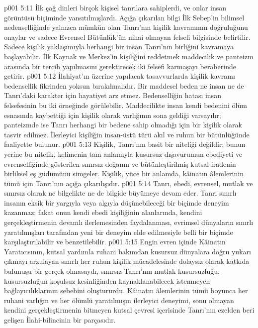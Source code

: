 \vs p001 5:11 İlk çağ dinleri birçok kişisel tanrılara sahiplerdi, ve onlar insan görüntüsü biçiminde yansıtılmışlardı. Açığa çıkarılan bilgi İlk Sebep’in bilimsel nedenselliğinde yalnızca mümkün olan Tanrı’nın kişilik kavramının doğruluğunu onaylar ve sadece Evrensel Bütünlük’ün nihai olmayan felsefi bilgisinde belirtilir. Sadece kişilik yaklaşımıyla herhangi bir insan Tanrı’nın birliğini kavramaya başlayabilir. İlk Kaynak ve Merkez’in kişiliğini reddetmek maddecilik ve panteizm arasında bir tercih yapılmasını gerektirecek iki felsefi karmaşayı beraberinde getirir.
\vs p001 5:12 İlahiyat’ın üzerine yapılacak tasavvurlarda kişilik kavramı bedensellik fikrinden yoksun bırakılmalıdır. Bir maddesel beden ne insan ne de Tanrı’daki karakter için hayatiyet arz etmez. Bedenselliğin hatası insan felsefesinin bu iki örneğinde görülebilir. Maddecilikte insan kendi bedenini ölüm esnasında kaybettiği için kişilik olarak varlığının sona geldiği varsayılır; panteizmde ise Tanrı herhangi bir bedene sahip olmadığı için bir kişilik olarak tasvir edilmez. İlerleyici kişiliğin insan\hyp{}üstü türü akıl ve ruhun bir bütünlüğünde faaliyette bulunur.
\vs p001 5:13 Kişilik, Tanrı’nın basit bir niteliği değildir; bunun yerine bu nitelik, kelimenin tam anlamıyla kusursuz dışavurumun ebediyeti ve evrenselliğinde gösterilen sınırsız doğanın ve bütünleştirilmiş kutsal iradenin birliksel eş güdümünü simgeler. Kişilik, yüce bir anlamda, kâinatın âlemlerinin tümü için Tanrı’nın açığa çıkarılışıdır.
\vs p001 5:14 Tanrı, ebedi, evrensel, mutlak ve sınırsız olarak ne bilgelikte ne de bilgide büyümeye devam eder. Tanrı sınırlı insanın eksik bir yargıyla veya algıyla düşünebileceği bir biçimde deneyim kazanmaz; fakat onun kendi ebedi kişiliğinin alanlarında, kendini gerçekleştirmenin devamlı ilerlemesinden faydalanması, evrimsel dünyaların sınırlı yaratılmışları tarafından yeni bir deneyim elde edilmesiyle belli bir biçimde karşılaştırılabilir ve benzetilebilir.
\vs p001 5:15 Engin evren içinde Kâinatın Yaratıcısının, kutsal yardımla ruhani bakımdan kusursuz dünyalara doğru yukarı çıkmayı arzulayan sınırlı her ruhun kişilik mücadelesinde dolaysız olarak katkıda bulunuşu bir gerçek olmasaydı, sınırsız Tanrı’nın mutlak kusursuzluğu, kusursuzluğun koşulsuz kesinliğinden kaynaklanabilecek istenmeyen bağlayıcılıklarının sebebini oluştururdu. Kâinatın âlemlerinin tümü boyunca her ruhani varlığın ve her ölümlü yaratılmışın ilerleyici deneyimi, sonu olmayan kendini gerçekleştirmenin bitmeyen kutsal çevresi içerisinde Tanrı’nın ezelden beri gelişen İlahi\hyp{}bilincinin bir parçasıdır.
